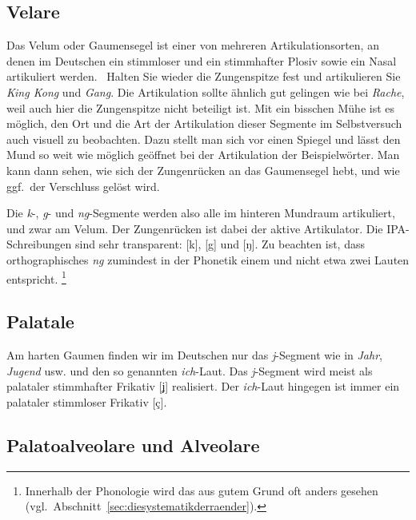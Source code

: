 \subsection{Velare}
\label{sec:velare}


Das Velum oder Gaumensegel ist einer von mehreren Artikulationsorten, an denen im Deutschen ein stimmloser und ein stimmhafter Plosiv sowie ein Nasal artikuliert werden.
\TuBegin~Halten Sie wieder die Zungenspitze fest und artikulieren Sie \textit{King Kong} und \textit{Gang}.
Die Artikulation sollte ähnlich gut gelingen wie bei \textit{Rache}, weil auch hier die Zungenspitze nicht beteiligt ist.
Mit ein bisschen Mühe ist es möglich, den Ort und die Art der Artikulation dieser Segmente im Selbstversuch auch visuell zu beobachten.
Dazu stellt man sich vor einen Spiegel und lässt den Mund so weit wie möglich geöffnet bei der Artikulation der Beispielwörter.
Man kann dann sehen, wie sich der Zungenrücken an das Gaumensegel hebt, und wie ggf.\ der Verschluss gelöst wird.

Die \textit{k}-, \textit{g}- und \textit{ng}-Segmente werden also alle im hinteren Mundraum artikuliert, und zwar am Velum.
Der Zungenrücken ist dabei der aktive Artikulator.
Die IPA-Schreibungen sind sehr transparent: [k], [g] und [ŋ].
Zu beachten ist, dass orthographisches \textit{ng} zumindest in der Phonetik einem und nicht etwa zwei Lauten entspricht.%
\footnote{Innerhalb der Phonologie wird das aus gutem Grund oft anders gesehen (vgl.\ Abschnitt~\ref{sec:diesystematikderraender}).}

\subsection{Palatale}
\label{sec:palatale}


Am harten Gaumen finden wir im Deutschen nur das \textit{j}-Segment wie in \textit{Jahr}, \textit{Jugend} usw. und den so genannten \textit{ich}-Laut.
Das \textit{j}-Segment wird meist als palataler stimmhafter Frikativ [ʝ] realisiert.
Der \textit{ich}-Laut hingegen ist immer ein palataler stimmloser Frikativ [ç].

\subsection{Palatoalveolare und Alveolare}
\label{sec:palatoalveolareundalveolare}


